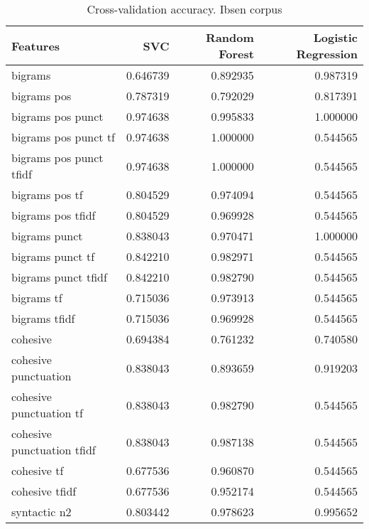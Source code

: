 \documentclass{article}
\begin{document}
\begin{table}
\centering
\caption{Cross-validation accuracy. Ibsen corpus}
\begin{tabular}{lrrr}
\toprule
{Features} &       SVC &  Random Forest &  Logistic Regression \\
\midrule
bigrams                    &  0.646739 &       0.892935 &             0.987319 \\
bigrams pos                &  0.787319 &       0.792029 &             0.817391 \\
bigrams pos punct          &  0.974638 &       0.995833 &             1.000000 \\
bigrams pos punct tf       &  0.974638 &       1.000000 &             0.544565 \\
bigrams pos punct tfidf    &  0.974638 &       1.000000 &             0.544565 \\
bigrams pos tf             &  0.804529 &       0.974094 &             0.544565 \\
bigrams pos tfidf          &  0.804529 &       0.969928 &             0.544565 \\
bigrams punct              &  0.838043 &       0.970471 &             1.000000 \\
bigrams punct tf           &  0.842210 &       0.982971 &             0.544565 \\
bigrams punct tfidf        &  0.842210 &       0.982790 &             0.544565 \\
bigrams tf                 &  0.715036 &       0.973913 &             0.544565 \\
bigrams tfidf              &  0.715036 &       0.969928 &             0.544565 \\
cohesive                   &  0.694384 &       0.761232 &             0.740580 \\
cohesive punctuation       &  0.838043 &       0.893659 &             0.919203 \\
cohesive punctuation tf    &  0.838043 &       0.982790 &             0.544565 \\
cohesive punctuation tfidf &  0.838043 &       0.987138 &             0.544565 \\
cohesive tf                &  0.677536 &       0.960870 &             0.544565 \\
cohesive tfidf             &  0.677536 &       0.952174 &             0.544565 \\
syntactic n2               &  0.803442 &       0.978623 &             0.995652 \\

\end{tabular}
\end{table}
\end{document}
